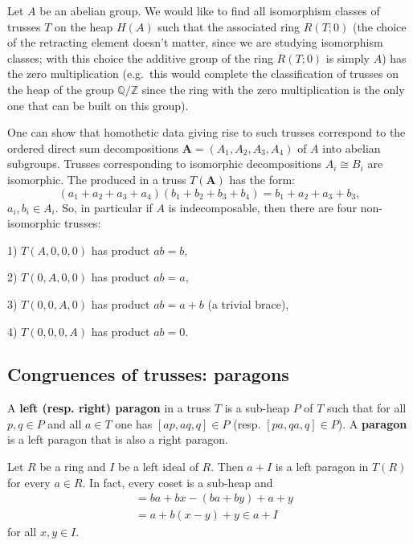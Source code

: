 \documentclass{svmult}
\begin{document}
\begin{example}
    Let $A$ be an abelian group. We would like to find all isomorphism classes of trusses $T$ on the heap $H(A)$ such that the associated ring $R(T;0)$ (the choice of the retracting element doesn't matter, since we are studying isomorphism classes; with this choice the additive group of the ring $R(T;0)$ is simply $A$) has the zero multiplication (e.g.\ this would complete the classification of trusses on the heap of the group $\mathbb{Q}/\mathbb{Z}$ since the ring with the zero multiplication is the only one that can be built on this group).
    
    One can show that homothetic data giving rise to such trusses correspond to the ordered direct sum decompositions $\mathbf{A} = (A_1,A_2,A_3,A_4)$ of $A$ into abelian subgroups. Trusses corresponding to isomorphic decompositions $A_i\cong B_i$ are isomorphic. The produced in a truss $T(\mathbf{A})$ has the form:
    \[
    (a_1+a_2+a_3+a_4)(b_1+b_2+b_3+b_4) = b_1+a_2+a_3+b_3,
    \]
    $a_i, b_i \in A_i$. So, in particular if $A$ is indecomposable, then there are four non-isomorphic trusses:
    
    1) $T(A,0,0,0)$ has product $ab=b$,
    
    2) $T(0,A,0,0)$ has product $ab=a$,
    
    3) $T(0,0,A,0)$ has product $ab=a+b$ (a trivial brace),
    
    4) $T(0,0,0,A)$ has product $ab=0$.
\end{example}

\subsection{Congruences of trusses: paragons}

\begin{definition}
    A \textbf{left (resp. right) paragon} in a truss $T$ is a sub-heap $P$ of $T$ 
    such that for all $p,q\in P$ and all $a\in T$ 
    one has $[ap,aq,q]\in P$ (resp. $[pa,qa,q]\in P$). A \textbf{paragon} 
    is a left paragon that is also a right paragon. 
\end{definition}

\begin{example}
    Let $R$ be a ring and $I$ be a left ideal of $R$. Then 
    $a+I$ is a left paragon in $T(R)$ for every $a\in R$. In fact, every coset is a sub-heap and
    \begin{align*}
    [b(a+x),b(a+y),a+y]&=ba+bx-(ba+by)+a+y\\
    &=a+b(x-y)+y\in a+I
    \end{align*}
    for all $x,y\in I$. 
\end{example}
\end{document}
